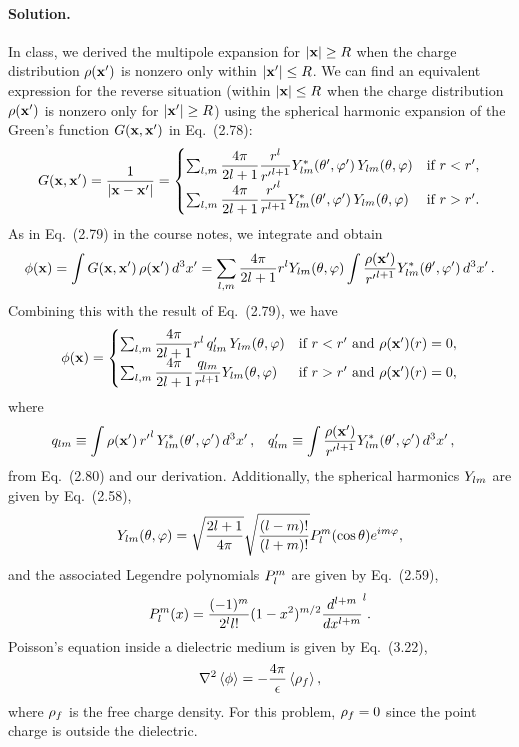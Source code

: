 \documentclass[11pt]{article}
\newcommand{\beq}{\begin{equation*}}
\newcommand{\eeq}{\end{equation*}}
\newcommand{\beqn}{\begin{equation}}
\newcommand{\eeqn}{\end{equation}}
\newenvironment{solution}
{
    \paragraph{Solution.}
    \ignorespaces
}
{
    \bigskip
}
\begin{document}
\begin{solution}
	In class, we derived the multipole expansion for $\abs{\mathbf{x}} \geq R$ when the charge distribution $\rho(\mathbf{x}')$ is nonzero only within $\abs{\mathbf{x}'} \leq R$.  We can find an equivalent expression for the reverse situation (within $\abs{\mathbf{x}} \leq R$ when the charge distribution $\rho(\mathbf{x}')$ is nonzero only for $\abs{\mathbf{x}'} \geq R$) using the spherical harmonic expansion of the Green's function $G(\mathbf{x}, \mathbf{x}')$ in Eq.~(2.78):
	\beq
		\Gxxp = \frac{1}{\abs{\vx - \vx'}}
		= \begin{cases} \sum_{l,m} \dfrac{4\pi}{2l + 1} \dfrac{r^l}{{r'}^{l + 1}} \Ylm^*\tvp \, \Ylm\tv & \tif r < r', \\
		\sum_{l,m} \dfrac{4\pi}{2l + 1} \dfrac{{r'}^l}{r^{l + 1}} \Ylm^*\tvp \, \Ylm\tv & \tif r > r'. \end{cases}
	\eeq
	As in Eq.~(2.79) in the course notes, we integrate and obtain
	\beq
		\phix = \int \Gxxp \, \rhoxp \dcxp
		= \sum_{l, m} \frac{4\pi}{2l + 1} r^l \Ylm\tv \int \frac{\rhoxp}{{r'}^{l+1}} \Ylm^*\tvp \dcxp.
	\eeq
	Combining this with the result of Eq.~(2.79), we have
	\beqn \label{multipole}
		\phix = \begin{cases} \sum_{l, m} \dfrac{4\pi}{2l + 1} r^l \, \qplm \, \Ylm\tv & \tif r < r' \text{ and } \rhoxp(r) = 0, \\
		\sum_{l,m} \dfrac{4\pi}{2l + 1} \dfrac{\qlm}{r^{l+1}} \Ylm\tv & \tif r > r'  \text{ and } \rhoxp(r) = 0, \end{cases}
	\eeqn
	where
	\begin{align*}
		q_{l m} &\equiv \int \rho(\mathbf{x}') \, {r'}^l \, Y_{l m}^*(\theta', \varphi') \dd[3]{x'}, &
		q'_{l m} &\equiv \int \frac{\rho(\mathbf{x}')}{{r'}^{l+1}} Y_{l m}^*(\theta', \varphi') \dd[3]{x'},
	\end{align*}
	from Eq.~(2.80) and our derivation.  Additionally, the spherical harmonics $Y_{l m}$ are given by Eq.~(2.58),
	\beq
		\Ylm\tv = \sqrt{\frac{2l + 1}{4\pi}} \sqrt{\frac{(l - m)!}{(l + m)!}} \Plm(\cost) e^{i m \vph},
	\eeq
	and the associated Legendre polynomials $P_l^m$ are given by Eq.~(2.59),
	\beq
		\Plm(x) = \frac{(-1)^m}{2^l l!} (1 - x^2)^{m/2} \dv[l + m]{}{x} (x^2 - 1)^l.
	\eeq	
	Poisson's equation inside a dielectric medium is given by Eq.~(3.22),
	\beq
		\lap\evphi = -\frac{4\pi}{\eps} \ev{\rhof},
	\eeq
	where $\rho_f$ is the free charge density.  For this problem, $\rho_f = 0$ since the point charge is outside the dielectric.
	

\end{solution}
\end{document}
